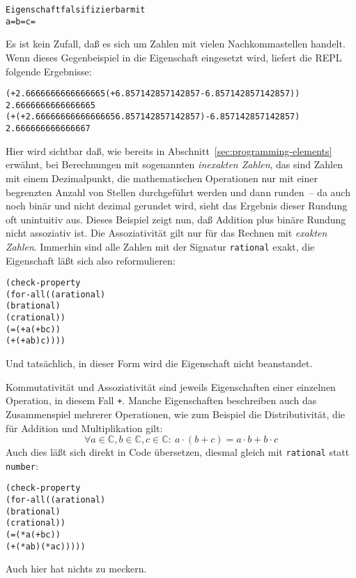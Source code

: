 %
\begin{alltt}
Eigenschaft falsifizierbar mit
  a =  b =  c = 
\end{alltt}
%
Es ist kein Zufall, daß es sich um Zahlen mit vielen Nachkommastellen
handelt.  Wenn dieses Gegenbeispiel in die Eigenschaft eingesetzt
wird, liefert die REPL folgende Ergebnisse:
%
\begin{alltt}
(+ 2.6666666666666665 (+ 6.857142857142857 -6.857142857142857))
\evalsto{} 2.6666666666666665
(+ (+ 2.6666666666666665 6.857142857142857) -6.857142857142857)
\evalsto{} 2.666666666666667
\end{alltt}
%
Hier wird sichtbar daß, wie bereits in
Abschnitt~\ref{sec:programming-elements} erwähnt, bei Berechnungen mit
sogenannten \textit{inexakten Zahlen}, das sind
Zahlen mit einem Dezimalpunkt, die mathematischen Operationen nur mit
einer begrenzten Anzahl von Stellen durchgeführt werden und dann runden~-- da
auch noch binär und nicht dezimal gerundet wird, sieht das Ergebnis
dieser Rundung oft unintuitiv aus.  Dieses Beispiel zeigt nun, daß
Addition plus binäre Rundung nicht assoziativ ist.  Die Assoziativität
gilt nur für das Rechnen mit \textit{exakten Zahlen}.  Immerhin sind alle Zahlen mit der Signatur
\texttt{rational} exakt, die
Eigenschaft läßt sich also reformulieren:
%
\begin{alltt}
(check-property
 (for-all ((a rational)
           (b rational)
           (c rational))
    (= (+ a (+ b c))
       (+ (+ a b) c))))
\end{alltt}
%
Und tatsächlich, in dieser Form wird die Eigenschaft nicht
beanstandet.

Kommutativität und Assoziativität sind jeweils Eigenschaften einer
einzelnen Operation, in diesem Fall \texttt{+}.  Manche Eigenschaften
beschreiben auch das Zusammenspiel mehrerer Operationen, wie zum
Beispiel die Distributivität, die für Addition und Multiplikation
gilt:
%
\begin{displaymath}
\forall a \in \mathbb{C}, b \in \mathbb{C}, c \in \mathbb{C}:\
a\cdot(b+c) = a\cdot b + b\cdot c
\end{displaymath}
%
Auch dies läßt sich direkt in Code übersetzen, diesmal gleich mit
\texttt{rational} statt \texttt{number}:
%
\begin{alltt}
(check-property
 (for-all ((a rational)
           (b rational)
           (c rational))
   (= (* a (+ b c))
      (+ (* a b) (* a c)))))
\end{alltt}
%
Auch hier hat \drscheme{} nichts zu meckern.


